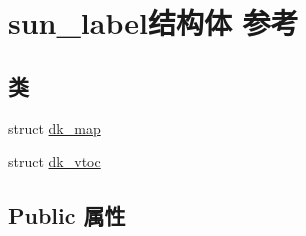 \hypertarget{structsun__label}{}\section{sun\+\_\+label结构体 参考}
\label{structsun__label}
\subsection*{类}
\begin{DoxyCompactItemize}
\item 
struct \hyperlink{structsun__label_1_1dk__map}{dk\+\_\+map}
\item 
struct \hyperlink{structsun__label_1_1dk__vtoc}{dk\+\_\+vtoc}
\end{DoxyCompactItemize}
\subsection*{Public 属性}
